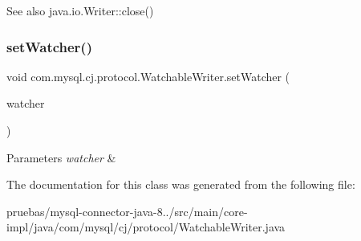 \begin{DoxySeeAlso}{See also}
java.\+io.\+Writer\+::close() 
\end{DoxySeeAlso}
\mbox{\label{classcom_1_1mysql_1_1cj_1_1protocol_1_1_watchable_writer_a272405ad2681cae2078138b821e0c324}} 
\subsubsection{\texorpdfstring{set\+Watcher()}{setWatcher()}}
{\footnotesize\ttfamily void com.\+mysql.\+cj.\+protocol.\+Watchable\+Writer.\+set\+Watcher (\begin{DoxyParamCaption}\item[{\mbox{\hyperlink{interfacecom_1_1mysql_1_1cj_1_1protocol_1_1_writer_watcher}{Writer\+Watcher}}}]{watcher }\end{DoxyParamCaption})}


\begin{DoxyParams}{Parameters}
{\em watcher} & \\
\hline
\end{DoxyParams}


The documentation for this class was generated from the following file\+:\begin{DoxyCompactItemize}
\item 
pruebas/mysql-\/connector-\/java-\/8../src/main/core-\/impl/java/com/mysql/cj/protocol/Watchable\+Writer.\+java\end{DoxyCompactItemize}
